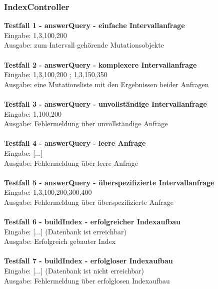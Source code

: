 \documentclass{scrartcl}
\begin{document}
\subsubsection{IndexController}
\textbf{Testfall 1 - answerQuery - einfache Intervallanfrage}\\
Eingabe: 1,3,100,200\\
Ausgabe: zum Intervall gehörende Mutationsobjekte\\
\\
\textbf{Testfall 2 - answerQuery - komplexere Intervallanfrage}\\
Eingabe: 1,3,100,200 ; 1,3,150,350\\
Ausgabe: eine Mutationsliste mit den Ergebnissen beider Anfragen\\
\\
\textbf{Testfall 3 - answerQuery - unvollständige Intervallanfrage}\\
Eingabe: 1,100,200\\
Ausgabe: Fehlermeldung über unvollständige Anfrage\\
\\
\textbf{Testfall 4 - answerQuery - leere Anfrage}\\
Eingabe: [...]\\
Ausgabe: Fehlermeldung über leere Anfrage\\
\\
\textbf{Testfall 5 - answerQuery - überspezifizierte Intervallanfrage}\\
Eingabe: 1,3,100,200,300,400\\
Ausgabe: Fehlermeldung über überspezifizierte Anfrage\\
\\
\textbf{Testfall 6 - buildIndex - erfolgreicher Indexaufbau}\\
Eingabe: [...] (Datenbank ist erreichbar)\\
Ausgabe: Erfolgreich gebauter Index\\
\\
\textbf{Testfall 7 - buildIndex - erfolgloser Indexaufbau}\\
Eingabe: [...] (Datenbank ist nicht erreichbar)\\
Ausgabe: Fehlermeldung über erfolglosen Indexaufbau
\newpage
\end{document}
